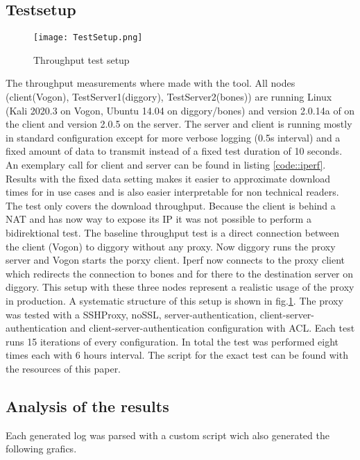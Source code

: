 \documentclass[12pt, a4paper]{scrartcl}
\begin{document}
\subsection{Testsetup}
\begin{figure}
    \centering
    \texttt{[image: TestSetup.png]}
    \caption{Throughput test setup}\label{fig::test}
\end{figure}
The throughput measurements where made with the  tool. All nodes (client(Vogon), TestServer1(diggory), TestServer2(bones)) are running Linux (Kali 2020.3 on Vogon, Ubuntu 14.04 on diggory/bones) and version 2.0.14a of  on the client and version 2.0.5 on the server. The  server and client is running mostly in standard configuration except for more verbose logging (0.5s interval) and a fixed amount of data to transmit instead of a fixed test duration of 10 seconds. An exemplary call for client and server can be found in listing \ref{code::iperf}. Results with the fixed data setting makes it easier to approximate download times for in use cases and is also easier interpretable for non technical readers.\newline
The test only covers the download throughput. Because the client is behind a NAT and has now way to expose its IP it was not possible to perform a bidirektional test.\newline
The baseline throughput test is a direct connection between the  client (Vogon) to diggory without any proxy. Now diggory runs the proxy server and Vogon starts the porxy client. Iperf now connects to the proxy client which redirects the connection to bones and for there to the destination  server on diggory. This setup with these three nodes represent a realistic usage of the proxy in production. A systematic structure of this setup is shown in fig.\@\ref{fig::test}.\newline
The proxy was tested with a SSHProxy, noSSL, server-authentication, client-server-authentication and client-server-authentication configuration with \ac{ACL}. Each test runs 15 iterations of every configuration. In total the test was performed eight times each with 6 hours interval. The script for the exact test can be found with the resources of this paper.
\subsection{Analysis of the results}
Each generated log was parsed with a custom script wich also generated the following grafics.
\end{document}
